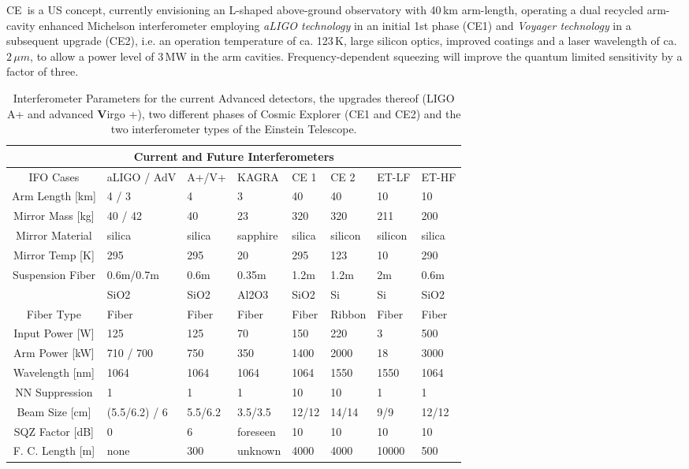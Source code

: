 \begin{tcolorbox}[standard jigsaw,colframe=antiquefuchsia!80!black,colback=antiquefuchsia!20!white,opacityback=0.6,coltext=black, title=Cosmic Explorer (CE)] 
CE\,\cite{CosmicExplorer2017} is a US concept, currently envisioning an L-shaped above-ground observatory with 40\,km arm-length, operating a dual recycled arm-cavity enhanced Michelson interferometer employing \emph{aLIGO technology} in an initial 1st phase (CE1) and \emph{Voyager technology} in a subsequent upgrade (CE2), i.e. an operation temperature of ca. 123\,K, large silicon optics, improved coatings and a laser wavelength of ca. $2\,\mu m$, to allow a power level of 3\,MW in the arm cavities. Frequency-dependent squeezing will improve the quantum limited sensitivity by a factor of three. \end{tcolorbox}

\begin{table}[h]
\centering
\begin{tabular}{|c|p{1.5cm}|l|p{1.6cm}|l|l|l|l|}
\hline
 \multicolumn{8}{|c|}{Current and Future Interferometers} \\
 \hline
IFO Cases &aLIGO / AdV &A+/V+ &KAGRA &CE 1 &CE 2 &ET-LF &ET-HF\\
\hline
Arm Length [km] & 4 / 3 &4& 3& 40& 40& 10 &10\\
\hline
Mirror Mass [kg]& 40 / 42& 40& 23& 320& 320& 211& 200\\
\hline
Mirror Material& silica& silica& sapphire& silica& silicon& silicon& silica\\
\hline
Mirror Temp [K]& 295& 295& 20& 295& 123& 10& 290\\
\hline
Suspension Fiber& 0.6m/0.7m& 0.6m& 0.35m& 1.2m& 1.2m& 2m& 0.6m\\
& SiO2& SiO2&Al2O3&SiO2&Si&Si&SiO2\\
\hline
Fiber Type& Fiber& Fiber& Fiber& Fiber& Ribbon& Fiber& Fiber\\
\hline
Input Power [W]& 125& 125& 70& 150& 220& 3& 500\\
\hline
Arm Power [kW]& 710 / 700& 750& 350& 1400& 2000& 18& 3000\\
\hline
Wavelength [nm]& 1064& 1064& 1064& 1064& 1550& 1550& 1064\\
\hline
NN Suppression& 1& 1& 1& 10& 10& 1& 1\\
\hline
Beam Size [cm]& (5.5/6.2) / 6& 5.5/6.2& 3.5/3.5& 12/12& 14/14& 9/9& 12/12\\
\hline
SQZ Factor [dB]& 0& 6& foreseen& 10& 10& 10& 10\\
\hline
F. C. Length [m]& none& 300& unknown& 4000& 4000& 10000& 500\\
\hline
\end{tabular}
\caption[FutIfos]{Interferometer Parameters for the current Advanced detectors, the upgrades thereof (LIGO A+ and advanced {\bf V}irgo +), two different phases of Cosmic Explorer (CE1 and CE2) and the two interferometer types of the Einstein Telescope.}
\label{FutIfos}
\end{table}

